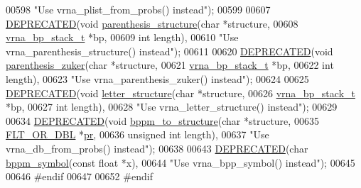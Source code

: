 \begin{DoxyCode}
00598 \textcolor{stringliteral}{"Use vrna\_plist\_from\_probs() instead"});
00599 
00607 \mbox{\hyperlink{structure__utils_8h_aab347a3c03fbe8e7319551b9fa0cce4a}{DEPRECATED}}(\textcolor{keywordtype}{void} \mbox{\hyperlink{group__struct__utils_gadf0ad2d46c9ca7b850437d1b79627a7e}{parenthesis\_structure}}(\textcolor{keywordtype}{char}            *structure,
00608                                       \mbox{\hyperlink{group__data__structures_structvrna__bp__stack__s}{vrna\_bp\_stack\_t}} *bp,
00609                                       \textcolor{keywordtype}{int}             length),
00610 \textcolor{stringliteral}{"Use vrna\_parenthesis\_structure() instead"});
00611 
00620 \mbox{\hyperlink{structure__utils_8h_aab347a3c03fbe8e7319551b9fa0cce4a}{DEPRECATED}}(\textcolor{keywordtype}{void} \mbox{\hyperlink{group__struct__utils_gab9c5c8311bd5120900585d4fa50c2df0}{parenthesis\_zuker}}(\textcolor{keywordtype}{char}            *structure,
00621                                   \mbox{\hyperlink{group__data__structures_structvrna__bp__stack__s}{vrna\_bp\_stack\_t}} *bp,
00622                                   \textcolor{keywordtype}{int}             length),
00623 \textcolor{stringliteral}{"Use vrna\_parenthesis\_zuker() instead"});
00624 
00625 \mbox{\hyperlink{structure__utils_8h_aab347a3c03fbe8e7319551b9fa0cce4a}{DEPRECATED}}(\textcolor{keywordtype}{void} \mbox{\hyperlink{group__struct__utils_ga9298b97ac972401e3bbcf5afa5740060}{letter\_structure}}(\textcolor{keywordtype}{char}             *structure,
00626                                  \mbox{\hyperlink{group__data__structures_structvrna__bp__stack__s}{vrna\_bp\_stack\_t}}  *bp,
00627                                  \textcolor{keywordtype}{int}              length),
00628 \textcolor{stringliteral}{"Use vrna\_letter\_structure() instead"});
00629 
00634 \mbox{\hyperlink{structure__utils_8h_aab347a3c03fbe8e7319551b9fa0cce4a}{DEPRECATED}}(\textcolor{keywordtype}{void}  \mbox{\hyperlink{group__struct__utils_ga129d81c4a1ead793c5b2311333e03dfa}{bppm\_to\_structure}}(\textcolor{keywordtype}{char}         *structure,
00635                                    \mbox{\hyperlink{group__data__structures_ga31125aeace516926bf7f251f759b6126}{FLT\_OR\_DBL}}   *\mbox{\hyperlink{fold__vars_8h_ac98ec419070aee6831b44e5c700f090f}{pr}},
00636                                    \textcolor{keywordtype}{unsigned} \textcolor{keywordtype}{int} length),
00637 \textcolor{stringliteral}{"Use vrna\_db\_from\_probs() instead"});
00638 
00643 \mbox{\hyperlink{structure__utils_8h_aab347a3c03fbe8e7319551b9fa0cce4a}{DEPRECATED}}(\textcolor{keywordtype}{char}    \mbox{\hyperlink{group__struct__utils_ga49962ad6242b8c628de6ca16bb831c1d}{bppm\_symbol}}(\textcolor{keyword}{const} \textcolor{keywordtype}{float} *x),
00644 \textcolor{stringliteral}{"Use vrna\_bpp\_symbol() instead"});
00645 
00646 \textcolor{preprocessor}{#endif}
00647 
00652 \textcolor{preprocessor}{#endif}
\end{DoxyCode}
